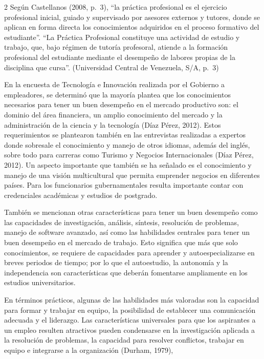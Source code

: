 \documentclass[12pt,spanish,Letterpaper,openany]{book}
\begin{document}
\begin {multicols}{2}
Según Castellanos (2008, p.~3), ``la práctica profesional es el ejercicio profesional inicial, guiado y supervisado por asesores externos y tutores, donde se aplican en forma directa los conocimientos adquiridos en el proceso formativo del estudiante''. ``La Práctica Profesional constituye una actividad de estudio y trabajo, que, bajo régimen de tutoría profesoral, atiende a la formación profesional del estudiante mediante el desempeño de labores propias de la disciplina que cursa''. (Universidad Central de Venezuela, S/A, p.~3)

En la encuesta de Tecnología e Innovación realizada por el Gobierno a empleadores, se determinó que la mayoría plantea que los conocimientos necesarios para tener un buen desempeño en el mercado productivo son: el dominio del área financiera, un amplio conocimiento del mercado y la administración de la ciencia y la tecnología (Díaz Pérez, 2012). Estos requerimientos se plantearon también en las entrevistas realizadas a expertos donde sobresale el conocimiento y manejo de otros idiomas, además del inglés, sobre todo para carreras como Turismo y Negocios Internacionales (Díaz Pérez, 2012). Un aspecto importante que también se ha señalado es el conocimiento y manejo de una visión multicultural que permita emprender negocios en diferentes países. Para los funcionarios gubernamentales resulta importante contar con credenciales académicas y estudios de postgrado.

También se mencionan otras características para tener un buen desempeño como las capacidades de investigación, análisis, síntesis, resolución de problemas, manejo de software avanzado, así como las habilidades centrales para tener un buen desempeño en el mercado de trabajo. Esto significa que más que solo conocimientos, se requiere de capacidades para aprender y autoespecializarse en breves periodos de tiempo; por lo que el autoestudio, la autonomía y la independencia son características que deberán fomentarse ampliamente en los estudios universitarios.

En términos prácticos, algunas de las habilidades más valoradas son la capacidad para formar y trabajar en equipo, la posibilidad de establecer una comunicación adecuada y el liderazgo. Las características universales para que los aspirantes a un empleo resulten atractivos pueden condensarse en la investigación aplicada a la resolución de problemas, la capacidad para resolver conflictos, trabajar en equipo e integrarse a la organización (Durham, 1979),


\end{multicols}
\end{document}
